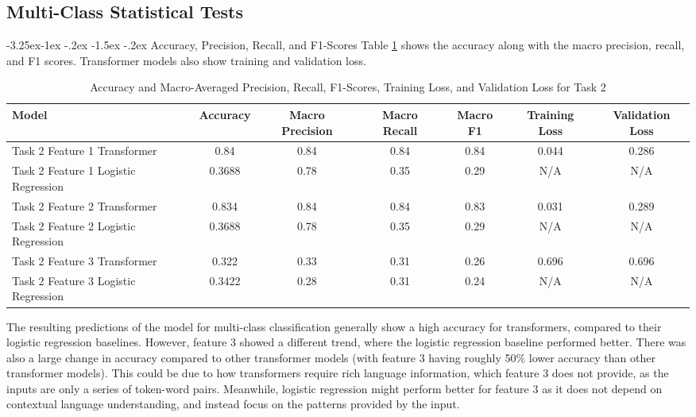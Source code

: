 \documentclass[10.7pt, onecolumn]{article}
\makeatletter
\renewcommand\subsubsection{\@startsection{subsubsection}{3}{\z@}%
	{-3.25ex\@plus -1ex \@minus -.2ex}%
    {-1.5ex \@plus -.2ex}%
    {\normalfont\itshape}}
\makeatother
\begin{document}

\subsection{Multi-Class Statistical Tests}

\subsubsection{Accuracy, Precision, Recall, and F1-Scores}
Table \ref{tab:task2accEtc} shows the accuracy along with the macro precision, recall, and F1 scores. Transformer models also show training and validation loss.
\begin{table}[H]
  \small
  \centering
  \setlength{\tabcolsep}{4pt} 
  \begin{tabular}{|p{3cm}|c|c|c|c|c|c|}
    \hline
    \textbf{Model} & \textbf{Accuracy} & \textbf{Macro Precision} & \textbf{Macro Recall} & \textbf{Macro F1}  & \textbf{Training Loss} & \textbf{Validation Loss}\\
    \hline
    Task 2 Feature 1 Transformer & 0.84  & 0.84  & 0.84  & 0.84 &0.044 &0.286\\
    \hline
    Task 2 Feature 1 Logistic Regression & 0.3688 & 0.78  & 0.35  & 0.29 & N/A &N/A\\
    \hline
    Task 2 Feature 2 Transformer & 0.834 & 0.84  & 0.84  & 0.83 &0.031 &0.289 \\
    \hline
    Task 2 Feature 2 Logistic Regression & 0.3688 & 0.78  & 0.35  & 0.29 &N/A &N/A\\
    \hline
    Task 2 Feature 3 Transformer & 0.322 & 0.33  & 0.31  & 0.26 &0.696 &0.696\\
    \hline
    Task 2 Feature 3 Logistic Regression & 0.3422 & 0.28  & 0.31  & 0.24 &N/A &N/A\\
    \hline
  \end{tabular}
  \caption{Accuracy and Macro-Averaged Precision, Recall, F1-Scores, Training Loss, and Validation Loss for Task 2}
  \label{tab:task2accEtc}
\end{table}

The resulting predictions of the model for multi-class classification generally show a high accuracy for transformers, compared to their logistic regression baselines. However, feature 3 showed a different trend, where the logistic regression baseline performed better. There was also a large change in accuracy compared to other transformer models (with feature 3 having roughly 50\% lower accuracy than other transformer models). This could be due to how transformers require rich language information, which feature 3 does not provide, as the inputs are only a series of token-word pairs. Meanwhile, logistic regression might perform better for feature 3 as it does not depend on contextual language understanding, and instead focus on the patterns provided by the input.
\end{document}
